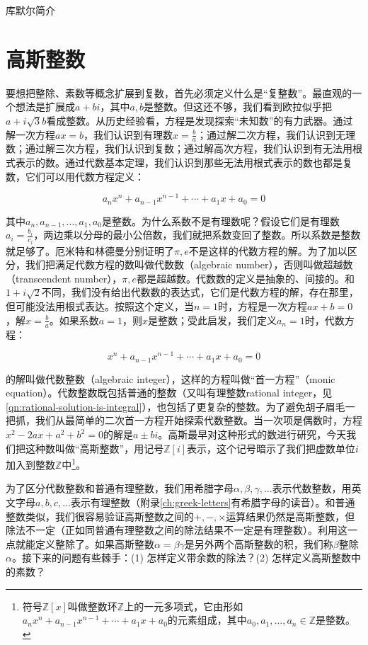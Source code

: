 \documentclass[b5paper]{ctexart}
\begin{document}
\begin{mdframed}
库默尔简介
\end{mdframed}

\section{高斯整数}

要想把整除、素数等概念扩展到复数，首先必须定义什么是“复整数”。最直观的一个想法是扩展成$a + bi$，其中$a, b$是整数。但这还不够，我们看到欧拉似乎把$a + i\sqrt{3}b$看成整数。从历史经验看，方程是发现探索“未知数”的有力武器。通过解一次方程$ax = b$，我们认识到有理数$x = \frac{b}{a}$；通过解二次方程，我们认识到无理数；通过解三次方程，我们认识到复数；通过解高次方程，我们认识到有无法用根式表示的数。通过代数基本定理，我们认识到那些无法用根式表示的数也都是复数，它们可以用代数方程定义：

\[
a_n x^n + a_{n-1} x^{n-1} + \dotsb + a_1 x + a_0 = 0
\]

其中$a_n, a_{n-1}, ..., a_1, a_0$是整数。为什么系数不是有理数呢？假设它们是有理数$a_i = \frac{b_i}{c_i}$，两边乘以分母的最小公倍数，我们就把系数变回了整数。所以系数是整数就足够了。厄米特和林德曼分别证明了$\pi, e$不是这样的代数方程的解。为了加以区分，我们把满足代数方程的数叫做代数数（algebraic number），否则叫做超越数（transcendent number），$\pi, e$都是超越数。代数数的定义是抽象的、间接的。和$1 + i\sqrt{2}$不同，我们没有给出代数数的表达式，它们是代数方程的解，存在那里，但可能没法用根式表达。按照这个定义，当$n = 1$时，方程是一次方程$ax + b = 0$，解$x = \frac{b}{a}$。如果系数$a = 1$，则$x$是整数；受此启发，我们定义$a_n = 1$时，代数方程：

\[
x^n + a_{n-1} x^{n-1} + \dotsb + a_1 x + a_0 = 0
\]

的解叫做代数整数（algebraic integer），这样的方程叫做“首一方程”（monic equation）。代数整数既包括普通的整数（又叫有理整数rational integer，见\cref{qn:rational-solution-is-integral}），也包括了更复杂的整数。为了避免胡子眉毛一把抓，我们从最简单的二次首一方程开始探索代数整数。当一次项是偶数时，方程$x^2 - 2ax + a^2 + b^2 = 0$的解是$a \pm bi$。高斯最早对这种形式的数进行研究，今天我们把这种数叫做“高斯整数”，用记号$\mathbb{Z}[i]$表示，这个记号暗示了我们把虚数单位$i$加入到整数$\mathbb{Z}$中\footnote{符号$\mathbb{Z}[x]$叫做整数环$\mathbb{Z}$上的一元多项式，它由形如$a_n x^n + a_{n-1} x^{n-1} + \dotsb + a_1 x + a_0$的元素组成，其中$a_0, a_1, \dotsc, a_n \in \mathbb{Z}$是整数。}。

为了区分代数整数和普通有理整数，我们用希腊字母$\alpha, \beta, \gamma, \dotsc$表示代数整数，用英文字母$a, b, c, \dotsc$表示有理整数（附录\ref{ch:greek-letters}有希腊字母的读音）。和普通整数类似，我们很容易验证高斯整数之间的$+, -, \times$运算结果仍然是高斯整数，但除法不一定（正如同普通有理整数之间的除法结果不一定是有理整数）。利用这一点就能定义整除了。如果高斯整数$\alpha = \beta\gamma$是另外两个高斯整数的积，我们称$\beta$整除$\alpha$。接下来的问题有些棘手：(1) 怎样定义带余数的除法？(2) 怎样定义高斯整数中的素数？
\end{document}
